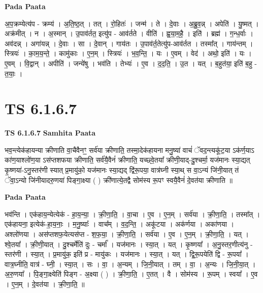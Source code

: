 \documentclass[17pt]{extarticle}
\begin{document}
\textbf{Pada Paata} \newline

अ॒प॒क्रम्येत्य॑प - क्रम्य॑ । अ॒ति॒ष्ठ॒त् । तत् । रो॒हितः॑ । जन्म॑ । ते । दे॒वाः । अ॒ब्रु॒व॒न्न् । अपेति॑ । यु॒ष्मत् । अक्र॑मीत् । न । अ॒स्मान् । उ॒पाव॑र्तत॒ इत्यु॑प - आव॑र्तते । वीति॑ । ह्व॒या॒म॒है॒ । इति॑ । ब्रह्म॑ । ग॒न्ध॒र्वाः । अव॑दन्न् । अगा॑यन्न् । दे॒वाः । सा । दे॒वान् । गाय॑तः । उ॒पाव॑र्त॒तेत्यु॑प-आव॑र्तत । तस्मा᳚त् । गाय॑न्तम् । स्त्रियः॑ । का॒म॒य॒न्ते॒ । कामु॑काः । ए॒न॒म् । स्त्रियः॑ । भ॒व॒न्ति॒ । यः । ए॒वम् । वेद॑ । अथो॒ इति॑ । यः । ए॒वम् । वि॒द्वान् । अपीति॑ । जन्ये॑षु । भव॑ति । तेभ्यः॑ । ए॒व । द॒द॒ति॒ । उ॒त । यत् । ब॒हुत॑या॒ इति॑ ब॒हु - त॒याः॒ ।  \newline




\section*{ TS 6.1.6.7 }

\textbf{TS 6.1.6.7 } \newline
\textbf{Samhita Paata} \newline

भव॒न्त्येक॑हायन्या क्रीणाति वा॒चैवैनꣳ॒॒ सर्व॑या क्रीणाति॒ तस्मा॒देक॑हायना मनु॒ष्या॑ वाचं॑ ॅवद॒न्त्यकू॑ट॒या ऽक॑र्ण॒याऽ का॑ण॒याश्लो॑ण॒या ऽस॑प्तशफया क्रीणाति॒ सर्व॑यै॒वैनं॑ क्रीणाति॒ यच्छ्वे॒तया᳚ क्रीणी॒याद्-दु॒श्चर्मा॒ यज॑मानः स्या॒द्यत् कृ॒ष्णया॑-ऽनु॒स्तर॑णी स्यात् प्र॒मायु॑को॒ यज॑मानः स्या॒द्यद् द्वि॑रू॒पया॒ वात्र॑घ्नी स्या॒थ् स वा॒ऽन्यं जि॑नी॒यात् तं ॅवा॒ऽन्यो जि॑नीयादरु॒णया॑ पिङ्गा॒क्ष्या ( ) क्री॑णात्ये॒तद्वै सोम॑स्य रू॒पꣳ स्वयै॒वैनं॑ दे॒वत॑या क्रीणाति ॥ \newline

\textbf{Pada Paata} \newline

भव॑न्ति । एक॑हाय॒न्येत्येक॑ - हा॒य॒न्या॒ । क्री॒णा॒ति॒ । वा॒चा । ए॒व । ए॒न॒म् । सर्व॑या । क्री॒णा॒ति॒ । तस्मा᳚त् । एक॑हायना॒ इत्येक॑-हा॒य॒नाः॒ । म॒नु॒ष्याः᳚ । वाच᳚म् । व॒द॒न्ति॒ । अकू॑टया । अक॑र्णया । अका॑णया । अश्लो॑णया । अस॑प्तशफ॒येत्यस॑प्त - श॒फ॒या॒ । क्री॒णा॒ति॒ । सर्व॑या । ए॒व । ए॒न॒म् । क्री॒णा॒ति॒ । यत् । श्वे॒तया᳚ । क्री॒णी॒यात् । दु॒श्चर्मेति॑ दुः - चर्मा᳚ । यज॑मानः । स्या॒त् । यत् । कृ॒ष्णया᳚ । अ॒नु॒स्तर॒णीत्य॑नु - स्तर॑णी । स्या॒त् । प्र॒मायु॑क॒ इति॑ प्र - मायु॑कः । यज॑मानः । स्या॒त् । यत् । द्वि॒रू॒पयेति॑ द्वि - रू॒पया᳚ । वात्र॒घ्नीति॒ वात्र॑ - घ्नी॒ । स्या॒त् । सः । वा॒ । अ॒न्यम् । जि॒नी॒यात् । तम् । वा॒ । अ॒न्यः । जि॒नी॒या॒त् । अ॒रु॒णया᳚ । पि॒ङ्गा॒क्ष्येति॑ पिङ्ग - अ॒क्ष्या ( ) । क्री॒णा॒ति॒ । ए॒तत् । वै । सोम॑स्य । रू॒पम् । स्वया᳚ । ए॒व । ए॒न॒म् । दे॒वत॑या । क्री॒णा॒ति॒ ॥  \newline
\end{document}
